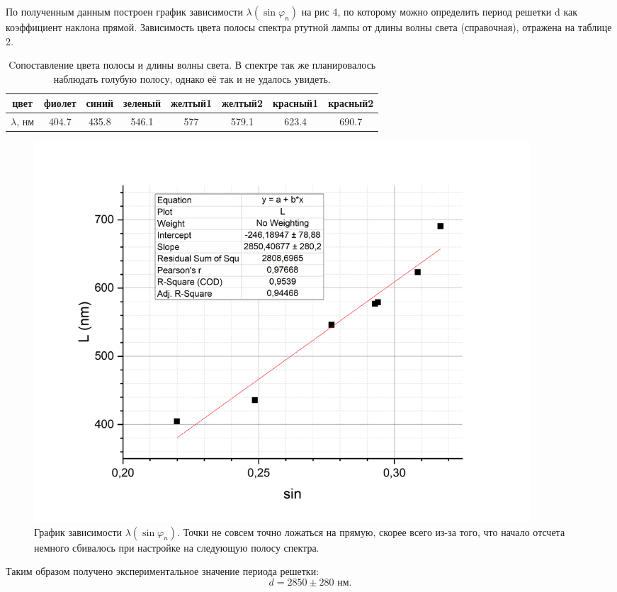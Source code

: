 \documentclass[a4paper, 14pt]{extarticle}%
\newcommand\ECaption[1]{%
     \captionsetup{font=footnotesize}%
     \caption{#1}}
\begin{document}
По полученным данным построен график зависимости $\lambda(\sin \varphi_n)$ на рис 4, по которому можно определить период решетки d как коэффициент наклона прямой. Зависимость цвета полосы спектра ртутной лампы от длины волны света (справочная), отражена на таблице 2.

\begin{table}[h!]
\begin{center}

\begin{tabular}{|c|c|c|c|c|c|c|c|}
\hline
\rowcolor[HTML]{9698ED} 
цвет          & фиолет & синий & зеленый & желтый1 & желтый2 & красный1 & красный2 \\ \hline
$\lambda$, нм & 404.7  & 435.8 & 546.1   & 577     & 579.1   & 623.4    & 690.7    \\ \hline
\end{tabular}
\ECaption{Cопоставление цвета полосы и длины волны света. В спектре так же планировалось наблюдать голубую полосу, однако её так и не удалось увидеть.}
\end{center}
\end{table}
       
\begin{figure}[h!]
\begin{center}
\includegraphics[width=0.9\textwidth]{gr1}
\end{center}
\ECaption{График зависимости $\lambda(\sin \varphi_n)$. Точки не совсем точно ложаться на прямую, скорее всего из-за того, что начало отсчета немного сбивалось при настройке на следующую полосу спектра.}
\end{figure}                             

Таким образом получено экспериментальное значение периода решетки:
\[d = 2850\pm 280\text{ нм.}\]
\end{document}
